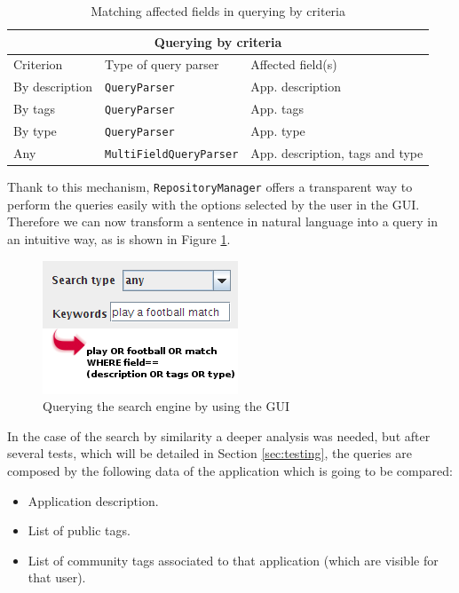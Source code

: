 \begin{table}[h!]
	\small
    \begin{center}
		\begin{tabular}{||l|l|l||}
        
		\hline \hline
		\multicolumn{3}{||c||}{\bfseries{Querying by criteria}} \\
		\hline
		\hline 
			Criterion & Type of query parser & Affected field(s)\\
		\hline \hline
			By description &  \verb|QueryParser| & App. description\\
			\hline
			By tags &  \verb|QueryParser| & App. tags\\
			\hline
			By type &  \verb|QueryParser| & App. type\\
			\hline
			Any &  \verb|MultiFieldQueryParser| & App. description, tags and type\\
			\hline
			\hline

		\end{tabular}
		\caption{\label{table:lucene-querying-criteria} Matching affected fields in
		querying by criteria}
	\end{center}
\end{table}

Thank to this mechanism,  \verb|RepositoryManager| offers a
transparent way to perform the queries easily with the options selected by the
user in the GUI. Therefore we can now transform a sentence in natural language 
into a query in an intuitive way, as is shown in Figure \ref{img:querying}.


\begin{figure}[h!]
 \begin{center}

 \includegraphics[scale=0.8]{screenshots/query-rich.png}
  \caption{\label{img:querying}Querying the search engine by using the GUI}
 \end{center}
\end{figure}

In the case of the search by similarity a deeper analysis was needed, but after
several tests, which will be detailed in Section \ref{sec:testing}, the queries
are composed by the following data of the application which is going to be
compared:
\begin{itemize}
  \item Application description.
  \item List of public tags.
  \item List of community tags associated to that application (which are visible
  for that user).
\end{itemize}

